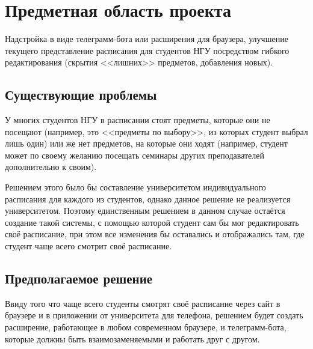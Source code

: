 \chapter{Предметная область проекта}
	Надстройка в виде телеграмм-бота или расширения для браузера, улучшение текущего представление расписания для студентов НГУ посредством гибкого редактирования (скрытия <<лишних>> предметов, добавления новых).

	\section{Существующие проблемы}
		У многих студентов НГУ в расписании стоят предметы, которые они не посещают (например, это <<предметы по выбору>>, из которых студент выбрал лишь один) или же нет предметов, на которые они ходят (например, студент может по своему желанию посещать семинары других преподавателей дополнительно к своим).

		Решением этого было бы составление университетом индивидуального расписания для каждого из студентов, однако данное решение не реализуется университетом. Поэтому единственным решением в данном случае остаётся создание такой системы, с помощью которой студент сам бы мог редактировать своё расписание, при этом все изменения бы оставались и отображались там, где студент чаще всего смотрит своё расписание. 
	\section{Предполагаемое решение}
	Ввиду того что чаще всего студенты смотрят своё расписание через сайт в браузере и в приложении от университета для телефона, решением будет создать расширение, работающее в любом современном браузере, и телеграмм-бота, которые должны быть взаимозаменяемыми и работать друг с другом.
